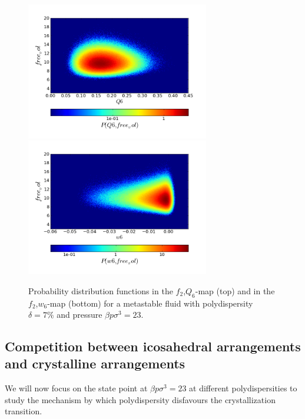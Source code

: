 \documentclass[twocolumn,superscriptaddress]{revtex4-1}
\begin{document}
\begin{figure}
 \centering
 \includegraphics[width=8cm,bb=0 0 576 432]{./figures/mesh_Q6free_vol.png}
 \includegraphics[width=8cm,bb=0 0 576 432]{./figures/mesh_w6free_vol.png}
 \caption{Probability distribution functions in the $f_2$,$Q_6$-map (top) and in
the $f_2$,$w_6$-map (bottom) for a metastable fluid with polydispersity $\delta=7\%$
and pressure $\beta p\sigma^3=23$.}
 \label{fig:f2decoupling}
\end{figure}





\subsection{Competition between icosahedral arrangements and crystalline arrangements}

We will now focus on the state point at $\beta p\sigma^3=23$ at different polydispersities to
study the mechanism by which polydispersity disfavours the crystallization transition.
\end{document}
